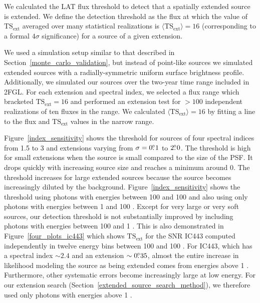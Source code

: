 \documentclass[12pt,preprint]{aastex}
\newcommand{\mev}{\text{MeV}\xspace}
\newcommand{\gev}{\text{GeV}\xspace}
\newcommand{\tsext}{{\ensuremath{\text{TS}_{\text{ext}}}}\xspace}
\begin{document}
We calculated the LAT flux threshold to detect that a spatially extended
source is extended. We define the detection threshold as the flux at
which the value of $\tsext$ averaged over many statistical realizations is
$\langle\tsext\rangle=16$ 
(corresponding to a formal $4\sigma$ significance)
for a source of a given extension.

We used a simulation setup similar to that described in
Section~\ref{monte_carlo_validation}, but instead of point-like sources
we simulated extended sources with a radially-symmetric uniform surface
brightness profile. Additionally, we simulated our sources over the two-year
time range included in 2FGL.  For each extension and spectral index,
we selected a flux range which bracketed $\tsext=16$ and performed an
extension test for $>100$ independent realizations of ten fluxes in
the range.  We calculated $\langle\tsext\rangle=16$ by fitting a line
to the flux and $\tsext$ values in the narrow range.

Figure~\ref{index_sensitivity} shows the threshold for sources of four
spectral indices from 1.5 to 3 and extensions varying from $\sigma=0\mbox{$.\!\!^\circ$}1$
to $2\mbox{$.\!\!^\circ$}0$.  
The threshold is high for small extensions when the
source is 
small compared to the size of the PSF. 
It drops quickly with increasing source size and reaches
a minimum around 0. 
The threshold increases
for large extended sources because the source becomes
increasingly diluted by the background.
Figure~\ref{index_sensitivity} shows
the threshold using photons with energies between 100 \mev and 100 \gev
and also using only photons with energies between 1 \gev and 100 \gev.
Except for very large or very soft
sources, our detection threshold is
not substantially improved by including photons with energies between 100 \mev and
1 \gev.  This is also demonstrated in Figure~\ref{four_plots_ic443}
which shows \tsext for the SNR IC443 computed independently in twelve
energy bins between 100 \mev and 100 \gev. For IC443, which has a
spectral index $\sim2.4$ and an extension $\sim0\mbox{$.\!\!^\circ$}35$, 
almost the entire increase in likelihood
modeling the source as being extended comes
from energies above 1 \gev.  Furthermore, other systematic errors
become increasingly large at low energy. For our extension search
(Section~\ref{extended_source_search_method}),
we therefore used only photons with energies above 1 \gev.
\end{document}
